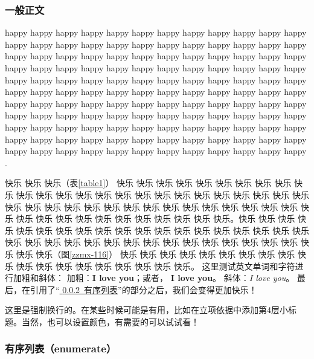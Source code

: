 
\subsubsection{一般正文}

\justifying

\indent\setlength{\parindent}{2em}%

happy happy happy happy happy happy happy happy happy happy happy happy happy happy happy happy happy happy happy happy happy happy happy happy happy happy happy happy happy happy happy happy happy happy happy happy happy happy happy happy happy happy happy happy happy happy happy happy happy happy happy happy happy happy happy happy happy happy happy happy happy happy happy happy happy happy happy happy happy happy happy happy happy happy happy happy happy happy happy happy happy\cite{Smith1900} happy happy happy happy happy happy happy happy happy happy happy happy happy happy happy happy happy happy happy happy happy happy happy happy happy happy happy happy happy happy happy happy happy happy happy happy happy happy happy happy happy happy happy happy happy happy happy happy happy happy happy \cite{Smith1900,Piter1992, John1997}.

快乐 快乐 快乐（表\ref{table1}） 快乐 快乐 快乐 快乐 快乐 快乐 快乐 快乐 快乐 快乐 快乐 快乐 快乐 快乐 快乐 快乐 快乐 快乐 快乐 快乐 快乐 快乐 快乐 快乐 快乐 快乐 快乐 快乐 快乐 快乐 快乐 快乐 快乐 快乐 快乐 快乐 快乐 快乐 快乐 快乐 快乐 快乐 快乐 快乐 快乐 快乐 快乐 快乐 快乐 快乐 快乐 快乐。快乐 快乐 快乐 快乐 快乐 快乐 快乐 快乐 快乐 快乐 快乐 快乐 快乐 快乐 快乐 快乐 快乐 快乐 快乐 快乐 快乐 快乐 快乐 快乐 快乐 快乐 快乐 快乐 快乐 快乐 快乐 快乐 快乐 快乐 快乐 快乐 快乐（图\ref{zzmx-116}） 快乐 快乐 快乐 快乐 快乐 快乐 快乐 快乐 快乐 快乐 快乐 快乐 快乐 快乐 快乐 快乐 快乐 快乐 快乐。
这里测试英文单词和字符进行加粗和斜体：
加粗：{\bfseries I love you}；或者，\textbf{ I love you}。
斜体：\textit{I love you}。
最后，在引用了“\hyperref[sec:有序列表]{\color{MsBlue} \ref{sec:有序列表}~有序列表}”的部分之后，我们会变得更加快乐！

\clearpage %

\indent\setlength{\parindent}{2em}

这里是强制换行的。在某些时候可能是有用，比如在立项依据中添加第4层小标题。当然，也可以设置颜色，有需要的可以试试看！

\subsubsection{有序列表（enumerate）}\label{sec:有序列表}
\indent\setlength{\parindent}{2em}

